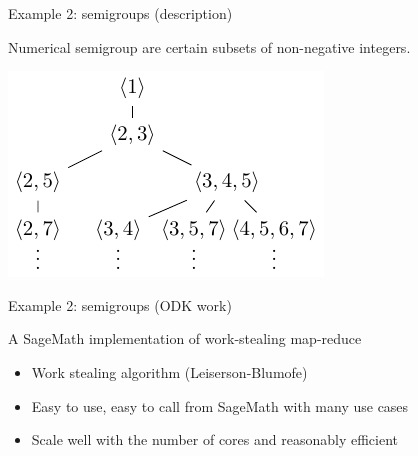 \documentclass{beamer}
\begin{document}
\begin{frame}{Example 2: semigroups (description)}
  \begin{example}
  Numerical semigroup are certain subsets of non-negative integers.
  \begin{center}%
  \includegraphics{Pictures/semigroups.pdf}%
  \end{center}%
  \end{example}

\end{frame}
\begin{frame}{Example 2: semigroups (ODK work)}

  \begin{block}{A SageMath implementation of work-stealing map-reduce}
    \begin{itemize}
    \item Work stealing algorithm (Leiserson-Blumofe)
    \item Easy to use, easy to call from SageMath with many use cases
    \item Scale well with the number of cores and reasonably efficient
    \end{itemize}
  \end{block}


 \hfill{}
 
\end{frame}
\end{document}
